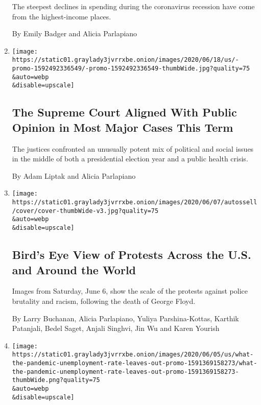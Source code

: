 \begin{enumerate}
  The steepest declines in spending during the coronavirus recession
  have come from the highest-income places.

  By Emily Badger and Alicia Parlapiano
\item
  \href{/interactive/2020/06/15/us/supreme-court-major-cases-2020.html}{}

  \texttt{[image: https://static01.graylady3jvrrxbe.onion/images/2020/06/18/us/-promo-1592492336549/-promo-1592492336549-thumbWide.jpg?quality=75\\\&auto=webp\\\&disable=upscale]}

  \hypertarget{the-supreme-court-aligned-with-public-opinion-in-most-major-cases-this-term}{%
  \subsection{The Supreme Court Aligned With Public Opinion in Most
  Major Cases This
  Term}\label{the-supreme-court-aligned-with-public-opinion-in-most-major-cases-this-term}}

  The justices confronted an unusually potent mix of political and
  social issues in the middle of both a presidential election year and a
  public health crisis.

  By Adam Liptak and Alicia Parlapiano
\item
  \href{/interactive/2020/06/07/us/george-floyd-protest-aerial-photos.html}{}

  \texttt{[image: https://static01.graylady3jvrrxbe.onion/images/2020/06/07/autossell/cover/cover-thumbWide-v3.jpg?quality=75\\\&auto=webp\\\&disable=upscale]}

  \hypertarget{birds-eye-view-of-protests-across-the-us-and-around-the-world}{%
  \subsection{Bird's Eye View of Protests Across the U.S. and Around the
  World}\label{birds-eye-view-of-protests-across-the-us-and-around-the-world}}

  Images from Saturday, June 6, show the scale of the protests against
  police brutality and racism, following the death of George Floyd.

  By Larry Buchanan, Alicia Parlapiano, Yuliya Parshina-Kottas, Karthik
  Patanjali, Bedel Saget, Anjali Singhvi, Jin Wu and Karen Yourish
\item
  \href{/interactive/2020/06/05/upshot/what-the-pandemic-unemployment-rate-leaves-out.html}{}

  \texttt{[image: https://static01.graylady3jvrrxbe.onion/images/2020/06/05/us/what-the-pandemic-unemployment-rate-leaves-out-promo-1591369158273/what-the-pandemic-unemployment-rate-leaves-out-promo-1591369158273-thumbWide.png?quality=75\\\&auto=webp\\\&disable=upscale]}


\end{enumerate}
